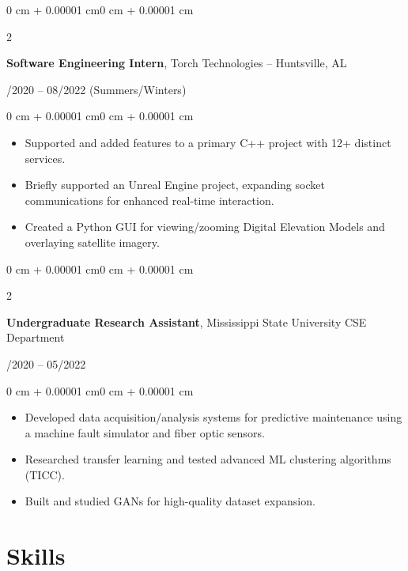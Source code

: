 \documentclass[10pt, letterpaper]{article}
\newenvironment{highlights}{
    \begin{itemize}[
        topsep=0.10 cm,
        parsep=0.10 cm,
        partopsep=0pt,
        itemsep=0pt,
        leftmargin=0 cm + 10pt
    ]
}{
    \end{itemize}
}
\newenvironment{onecolentry}{
    \begin{adjustwidth}{0 cm + 0.00001 cm}{0 cm + 0.00001 cm}
}{
    \end{adjustwidth}
}
\newenvironment{twocolentry}[2][]{
    \onecolentry
    \def\secondColumn{#2}
    \setcolumnwidth{\fill, 4.5 cm}
    \begin{paracol}{2}
}{
    \switchcolumn \raggedleft \secondColumn
    \end{paracol}
    \endonecolentry
}
\begin{document}
\vspace{0.4 cm}

\begin{twocolentry}{05/2020 – 08/2022 (Summers/Winters)}
    \textbf{Software Engineering Intern}, Torch Technologies -- Huntsville, AL
\end{twocolentry}

\vspace{0.10 cm}
\begin{onecolentry}
    \begin{highlights}
        \item Supported and added features to a primary C++ project with 12+ distinct services.
        \item Briefly supported an Unreal Engine project, expanding socket communications for enhanced real-time interaction.
        \item Created a Python GUI for viewing/zooming Digital Elevation Models and overlaying satellite imagery.
    \end{highlights}
\end{onecolentry}

\vspace{0.4 cm}

\begin{twocolentry}{09/2020 – 05/2022}
    \textbf{Undergraduate Research Assistant}, Mississippi State University CSE Department
\end{twocolentry}

\vspace{0.10 cm}
\begin{onecolentry}
    \begin{highlights}
        \item Developed data acquisition/analysis systems for predictive maintenance using a machine fault simulator and fiber optic sensors.
        \item Researched transfer learning and tested advanced ML clustering algorithms (TICC).
        \item Built and studied GANs for high-quality dataset expansion.
    \end{highlights}
\end{onecolentry}


\section{Skills}
\end{document}
